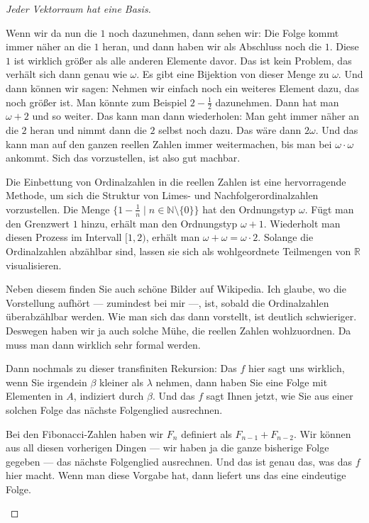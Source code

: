 \begin{proof}[Jeder Vektorraum hat eine Basis]
\begin{spoken-clean}[00:45:25 - 00:47:00]
Wenn wir da nun die $1$ noch dazunehmen, dann sehen wir: Die Folge kommt immer näher an die $1$ heran, und dann haben wir als Abschluss noch die $1$. Diese $1$ ist wirklich größer als alle anderen Elemente davor. Das ist kein Problem, das verhält sich dann genau wie $\omega$. Es gibt eine Bijektion von dieser Menge zu $\omega$. Und dann können wir sagen: Nehmen wir einfach noch ein weiteres Element dazu, das noch größer ist. Man könnte zum Beispiel $2 - \frac{1}{2}$ dazunehmen. Dann hat man $\omega + 2$ und so weiter. Das kann man dann wiederholen: Man geht immer näher an die $2$ heran und nimmt dann die $2$ selbst noch dazu. Das wäre dann $2\omega$. Und das kann man auf den ganzen reellen Zahlen immer weitermachen, bis man bei $\omega \cdot \omega$ ankommt. Sich das vorzustellen, ist also gut machbar.
\end{spoken-clean}

\begin{didactic-insight}
Die Einbettung von Ordinalzahlen in die reellen Zahlen ist eine hervorragende Methode, um sich die Struktur von Limes- und Nachfolgerordinalzahlen vorzustellen. Die Menge $\{1 - \frac{1}{n} \mid n \in \mathbb{N} \setminus \{0\}\}$ hat den Ordnungstyp $\omega$. Fügt man den Grenzwert $1$ hinzu, erhält man den Ordnungstyp $\omega + 1$. Wiederholt man diesen Prozess im Intervall $[1, 2)$, erhält man $\omega + \omega = \omega \cdot 2$. Solange die Ordinalzahlen abzählbar sind, lassen sie sich als wohlgeordnete Teilmengen von $\mathbb{R}$ visualisieren.
\end{didactic-insight}

\begin{spoken-clean}[00:47:00 - 00:49:10]
Neben diesem  finden Sie auch schöne Bilder auf Wikipedia. Ich glaube, wo die Vorstellung aufhört --- zumindest bei mir ---, ist, sobald die Ordinalzahlen überabzählbar werden. Wie man sich das dann vorstellt, ist deutlich schwieriger. Deswegen haben wir ja auch solche Mühe, die reellen Zahlen wohlzuordnen. Da muss man dann wirklich sehr formal werden.

Dann nochmals zu dieser transfiniten Rekursion: Das $f$ hier sagt uns wirklich, wenn Sie irgendein $\beta$ kleiner als $\lambda$ nehmen, dann haben Sie eine Folge mit Elementen in $A$, indiziert durch $\beta$. Und das $f$ sagt Ihnen jetzt, wie Sie aus einer solchen Folge das nächste Folgenglied ausrechnen.

Bei den Fibonacci-Zahlen haben wir $F_n$ definiert als $F_{n-1} + F_{n-2}$. Wir können aus all diesen vorherigen Dingen --- wir haben ja die ganze bisherige Folge gegeben --- das nächste Folgenglied ausrechnen. Und das ist genau das, was das $f$ hier macht. Wenn man diese Vorgabe hat, dann liefert uns das eine eindeutige Folge.


\end{spoken-clean}
\end{proof}
